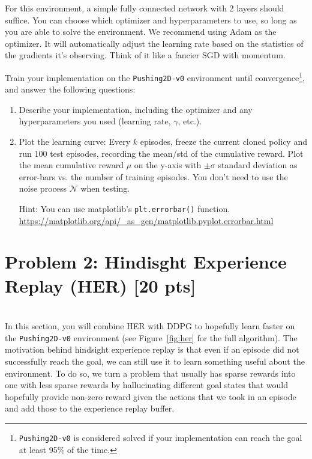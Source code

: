 \documentclass[12pt]{article}
\begin{document}
For this environment, a simple fully connected network with 2 layers should suffice.  You can choose which optimizer and hyperparameters to use, so long as you are able to solve the environment. We recommend using Adam as the optimizer. It will automatically adjust the learning rate based on the statistics of the gradients it's observing. Think of it like a fancier SGD with momentum. 

Train your implementation on the \texttt{Pushing2D-v0} environment until convergence\footnote{\texttt{Pushing2D-v0} is considered solved if your implementation can reach the goal at least 95\% of the time.}, and answer the following questions:

\begin{enumerate}
\item Describe your implementation, including the optimizer and any hyperparameters you used (learning rate, $\gamma$, etc.).
 \begin{solution}
\end{solution}
\item  Plot the learning curve: Every $k$ episodes, freeze the current cloned policy and run 100 test episodes, recording the mean/std of the cumulative reward. Plot the mean cumulative reward $\mu$ on the y-axis with $\pm \sigma$ standard deviation as error-bars vs. the number of training episodes.  You don't need to use the noise process $\mathcal{N}$ when testing.

Hint: You can use matplotlib's \texttt{plt.errorbar()} function. \url{https://matplotlib.org/api/\_as\_gen/matplotlib.pyplot.errorbar.html}
 \begin{solution}
\end{solution}
\end{enumerate}


\section*{Problem 2: Hindisght Experience Replay (HER) \textbf{[20 pts]}}
\ \\
In this section, you will combine HER with DDPG to hopefully learn faster on the \texttt{Pushing2D-v0} environment (see Figure~\ref{fig:her} for the full algorithm).  The motivation behind hindsight experience replay is that even if an episode did not successfully reach the goal, we can still use it to learn something useful about the environment.  To do so, we turn a problem that usually has sparse rewards into one with less sparse rewards by hallucinating different goal states that would hopefully provide non-zero reward given the actions that we took in an episode and add those to the experience replay buffer.  
\end{document}
